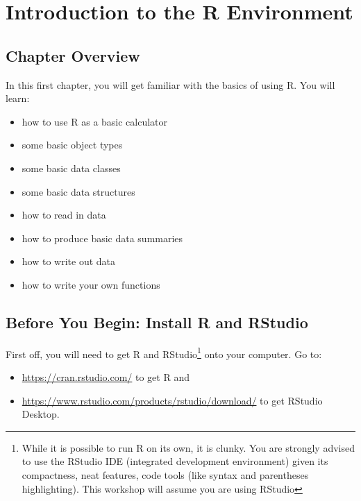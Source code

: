 \documentclass[]{book}
\providecommand{\tightlist}{%
  \setlength{\itemsep}{0pt}\setlength{\parskip}{0pt}}
\let\rmarkdownfootnote\footnote%
\def\footnote{\protect\rmarkdownfootnote}
\theoremstyle{definition}
\theoremstyle{definition}
\theoremstyle{definition}
\theoremstyle{remark}
\begin{document}
\chapter{Introduction to the R Environment}\label{ch1}

\section*{Chapter Overview}\label{chapter-overview}

In this first chapter, you will get familiar with the basics of using R.
You will learn:

\begin{itemize}
\tightlist
\item
  how to use R as a basic calculator
\item
  some basic object types
\item
  some basic data classes
\item
  some basic data structures
\item
  how to read in data
\item
  how to produce basic data summaries
\item
  how to write out data
\item
  how to write your own functions
\end{itemize}

\section*{Before You Begin: Install R and
RStudio}\label{before-you-begin-install-r-and-rstudio}

First off, you will need to get R and RStudio\footnote{While it is
  possible to run R on its own, it is clunky. You are strongly advised
  to use the RStudio IDE (integrated development environment) given its
  compactness, neat features, code tools (like syntax and parentheses
  highlighting). This workshop will assume you are using RStudio} onto
your computer. Go to:

\begin{itemize}
\tightlist
\item
  \url{https://cran.rstudio.com/} to get R and
\item
  \url{https://www.rstudio.com/products/rstudio/download/} to get
  RStudio Desktop.
\end{itemize}
\end{document}
